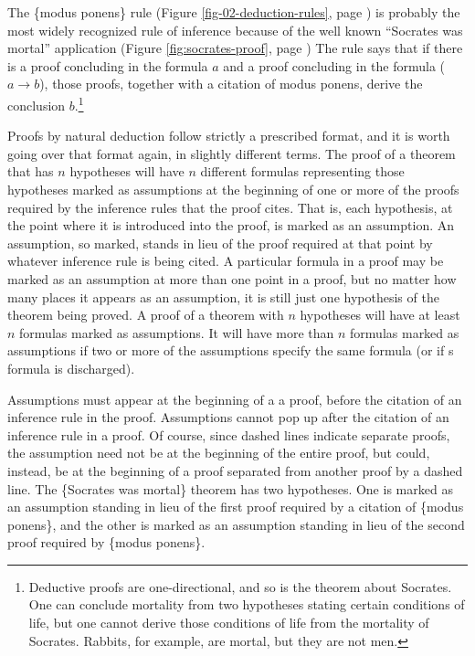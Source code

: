 The \{modus ponens\} rule
(Figure \ref{fig-02-deduction-rules}, page \pageref{fig-02-deduction-rules})
is probably the most widely recognized rule of inference because
of the well known ``Socrates was mortal'' application
(Figure \ref{fig:socrates-proof}, page \pageref{fig:socrates-proof})
The rule says that if there is a proof concluding in
the formula $a$ and a proof concluding in the formula ($a \rightarrow b$),
those proofs, together with a citation of modus ponens,
derive the conclusion $b$.\footnote{Deductive
proofs are one-directional,
and so is the theorem about Socrates.
One can conclude mortality from two hypotheses stating certain conditions of life,
but one cannot derive those conditions of life from the mortality of Socrates.
Rabbits, for example, are mortal, but they are not men.}

Proofs by natural deduction follow strictly a prescribed format,
and it is worth going over that format again, in slightly different terms.
The proof of a theorem that has
$n$ hypotheses will have $n$ different
formulas representing those hypotheses
marked as assumptions
at the beginning of one or more of the proofs
required by the inference rules that the proof cites.
That is, each hypothesis, at the point where it is introduced
into the proof, is marked as an assumption.
An assumption, so marked, stands in lieu of the proof
required at that point by whatever inference rule is being cited.
A particular formula in a proof may be marked as an assumption
at more than one point in a proof, but no matter how many places
it appears as an assumption, it is still just
one hypothesis of the theorem being proved.
A proof of a theorem with $n$ hypotheses will have at least $n$
formulas marked as assumptions.
It will have more than $n$ formulas marked as assumptions
if two or more of the assumptions specify the same formula
(or if s formula is discharged).

Assumptions must appear at the beginning of a
a proof, before the citation of an
inference rule in the proof.
Assumptions cannot pop up after the citation
of an inference rule in a proof.
Of course, since 
dashed lines indicate separate proofs,
the assumption need not be at the beginning of the entire
proof, but could, instead, be at the beginning of
a proof separated from another proof by a dashed line.
The \{Socrates was mortal\} theorem has two hypotheses.
One is marked as an assumption standing in lieu of the first proof
required by a citation of \{modus ponens\},
and the other is marked as an assumption
standing in lieu of the second proof
required by \{modus ponens\}.

